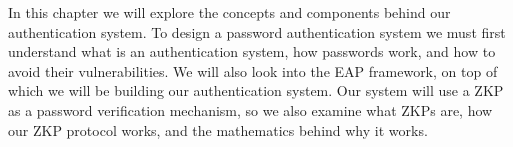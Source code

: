 \noindent
In this chapter we will explore the concepts and components behind our authentication system.
To design a password authentication system we must first understand what is an authentication system, how passwords work, and how to avoid their vulnerabilities.
We will also look into the EAP framework, on top of which we will be building our authentication system.
Our system will use a ZKP as a password verification mechanism, so we also examine what ZKPs are, how our ZKP protocol works, and the mathematics behind why it works.